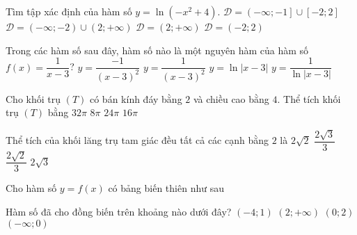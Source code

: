 \begin{ex}%
Tìm tập xác định của hàm số $y=\ln \left(-x^2+4\right)$.
\choice
{$\mathscr{D}=\left(-\infty ;-1\right]\cup [-2;2]$}
{$\mathscr{D}=\left(-\infty ;-2\right)\cup \left(2;+\infty\right)$}
{$\mathscr{D}=\left(2;+\infty\right)$}
{\True $\mathscr{D}=(-2;2)$}
\end{ex}


\begin{ex}%
Trong các hàm số sau đây, hàm số nào là một nguyên hàm của hàm số $f(x)=\dfrac{1}{x-3}$?
\choice
{$y=\dfrac{-1}{(x-3)^2}$}
{$y=\dfrac{1}{(x-3)^2}$}
{\True $y=\ln |x-3|$}
{$y= \dfrac{1}{\ln |x-3|}$}
\end{ex}

\begin{ex}%
Cho khối trụ $(T)$ có bán kính đáy bằng $2$ và chiều cao bằng $4$. Thể tích khối trụ $(T)$ bằng
\choice
{$32\pi $}
{$8\pi $}
{$24\pi $}
{\True $16\pi $}
\end{ex}


\begin{ex}%
Thể tích của khối lăng trụ tam giác đều tất cả các cạnh bằng $2$ là
\choice
{$2\sqrt{2}$}
{$\dfrac{2\sqrt{3}}{3}$}
{$\dfrac{2\sqrt{2}}{3}$}
{\True $2\sqrt{3}$}
\end{ex}


\begin{ex}%
Cho hàm số $y=f(x)$ có bảng biến thiên như sau
\begin{center}
\end{center}
Hàm số đã cho đồng biến trên khoảng nào dưới đây?
\choice
{$(-4;1)$}
{$\left(2;+\infty\right)$}
{\True $\left(0;2\right)$}
{$\left(-\infty;0\right)$}
\end{ex}


